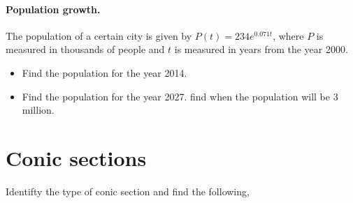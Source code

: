 \documentclass[a4paper]{tufte-handout} %
\begin{document}
\paragraph{Population growth.} The population of a certain city is given by $P(t)=234e^{0.071 t}$, where $P$ is measured in thousands of people and $t$ is measured in years from the year 2000.
\begin{itemize}
    \item Find the population for the year 2014.
    \item Find the population for the year 2027.
        find when the population will be 3 million.
\end{itemize}

\newpage


\section{Conic sections}

Identifty the type of conic section and find the following,

\vspace{2em}
\end{document}

